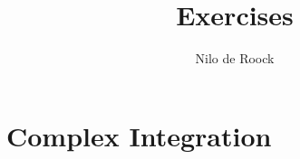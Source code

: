 \documentclass[a4paper,11pt,oneside]{book}
\title{Exercises}
\author{Nilo de Roock}
\date{\Date}
\begin{document}
    \maketitle

    \tableofcontents{}

    \newpage
    \thispagestyle{empty}
    \chapter{Complex Integration}






\end{document}
